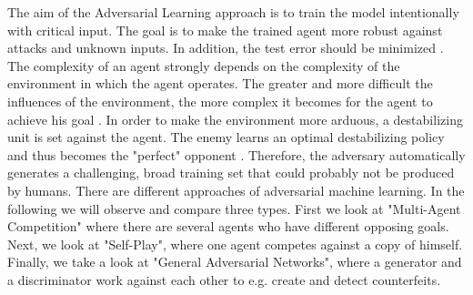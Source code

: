 The aim of the Adversarial Learning approach is to train the model intentionally with critical input. The goal is to make the trained agent more robust against attacks and unknown inputs. In addition, the test error should be minimized \cite{MachineLearningAtScale}.
The complexity of an agent strongly depends on the complexity of the environment in which the agent operates. The greater and more difficult the influences of the environment, the more complex it becomes for the agent to achieve his goal \cite{environmentBansal2017Oct}.
In order to make the environment more arduous, a destabilizing unit is set against the agent. The enemy learns an optimal destabilizing policy and thus becomes the "perfect" opponent \cite{robustPinto2017Mar}. Therefore, the adversary automatically generates a challenging, broad training set that could probably not be produced by humans.
There are different approaches of adversarial machine learning. In the following we will observe and compare three types. First we look at "Multi-Agent Competition" where there are several agents who have different opposing goals. Next, we look at "Self-Play", where one agent competes against a copy of himself. Finally, we take a look at "General Adversarial Networks", where a generator and a discriminator work against each other to e.g. create and detect counterfeits.